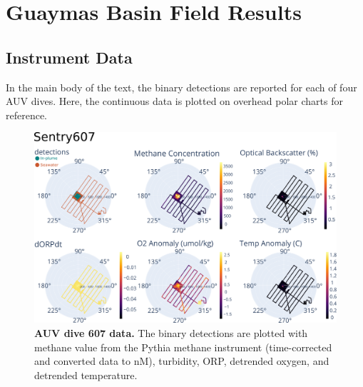 \chapter{Guaymas Basin Field Results}

\section{Instrument Data}
In the main body of the text, the binary detections are reported for each of four AUV \Sentry dives. Here, the continuous data is plotted on overhead polar charts for reference.

\begin{figure}
    \centering
    \includegraphics[width=1\columnwidth]{figures/app_sentry607_data.png}
    \caption[AUV \Sentry dive 607 data.]{\textbf{AUV \Sentry dive 607 data.} The binary detections are plotted with methane value from the Pythia methane instrument (time-corrected and converted data to nM), turbidity, ORP, detrended oxygen, and detrended temperature.}
    \label{fig:app:field:sentry607}
\end{figure}


